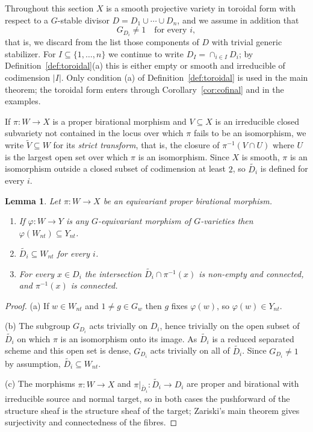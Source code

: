 \documentclass[11pt]{amsart}
\theoremstyle{plain}
\newtheorem{lemma}[theorem]{Lemma}
\theoremstyle{definition}
\theoremstyle{remark}
\numberwithin{equation}{section}
\begin{document}
Throughout this section $X$ is a smooth projective variety in toroidal
form with respect to a $G$-stable divisor $D = D_1 \cup \cdots \cup D_n$,
and we assume in addition that
\[
G_{D_i} \neq 1 \quad \text{for every } i ,
\]
that is, we discard from the list those components of $D$ with trivial
generic stabilizer.  For $I \subseteq \{1,\ldots,n\}$ we continue to write
$D_I = \cap_{i \in I} D_i$; by Definition~\ref{def:toroidal}(a) this is
either empty or smooth and irreducible of codimension $|I|$.  Only
condition (a) of Definition~\ref{def:toroidal} is used in the main theorem;
the toroidal form enters through Corollary~\ref{cor:cofinal} and in the
examples.

If $\pi : W \to X$ is a proper birational morphism and $V \subseteq X$ is
an irreducible closed subvariety not contained in the locus over which
$\pi$ fails to be an isomorphism, we write $\widetilde{V} \subseteq W$ for
its \emph{strict transform}, that is, the closure of $\pi^{-1}(V \cap U)$
where $U$ is the largest open set over which $\pi$ is an isomorphism.
Since $X$ is smooth, $\pi$ is an isomorphism outside a closed subset of
codimension at least $2$, so $\widetilde{D_i}$ is defined for every $i$.

\begin{lemma} \label{lem:fabulous_basics}
Let $\pi : W \to X$ be an equivariant proper birational morphism.
\begin{enumerate}
\item If $\varphi : W \to Y$ is any $G$-equivariant morphism of
$G$-varieties then $\varphi(W_{nt}) \subseteq Y_{nt}$.
\item $\widetilde{D_i} \subseteq W_{nt}$ for every $i$.
\item For every $x \in D_i$ the intersection $\widetilde{D_i} \cap
\pi^{-1}(x)$ is non-empty and connected, and $\pi^{-1}(x)$ is connected.
\end{enumerate}
\end{lemma}

\begin{proof}
(a) If $w \in W_{nt}$ and $1 \neq g \in G_w$ then $g$ fixes $\varphi(w)$,
so $\varphi(w) \in Y_{nt}$.

(b) The subgroup $G_{D_i}$ acts trivially on $D_i$, hence trivially on the
open subset of $\widetilde{D_i}$ on which $\pi$ is an isomorphism onto its
image.  As $\widetilde{D_i}$ is a reduced separated scheme and this open set
is dense, $G_{D_i}$ acts trivially on all of $\widetilde{D_i}$.  Since
$G_{D_i} \neq 1$ by assumption, $\widetilde{D_i} \subseteq W_{nt}$.

(c) The morphisms $\pi : W \to X$ and $\pi|_{\widetilde{D_i}} :
\widetilde{D_i} \to D_i$ are proper and birational with irreducible source
and normal target, so in both cases the pushforward of the structure sheaf
is the structure sheaf of the target; Zariski's main theorem gives
surjectivity and connectedness of the fibres.
\end{proof}
\end{document}
